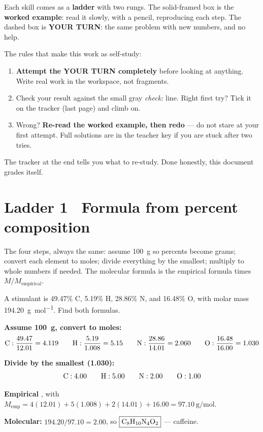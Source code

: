 \documentclass{apchem-worksheet}
\begin{document}
\apctitleblock

\begin{apcnote}
Each skill comes as a \textbf{ladder} with two rungs. The solid-framed box
is the \textbf{worked example}: read it slowly, with a pencil, reproducing
each step. The dashed box is \textbf{YOUR TURN}: the same problem with new
numbers, and no help.

The rules that make this work as self-study:
\begin{enumerate}[leftmargin=*,itemsep=0.15em]
  \item \textbf{Attempt the YOUR TURN completely} before looking at
        anything. Write real work in the workspace, not fragments.
  \item Check your result against the small gray \emph{check:} line. Right
        first try? Tick it on the tracker (last page) and climb on.
  \item Wrong? \textbf{Re-read the worked example, then redo} --- do not
        stare at your first attempt. Full solutions are in the teacher
        key if you are stuck after two tries.
\end{enumerate}
The tracker at the end tells you what to re-study. Done honestly, this
document grades itself.
\end{apcnote}

\section*{\sffamily Ladder 1 \textbullet\ Formula from percent composition}

The four steps, always the same: assume \SI{100}{\gram} so percents become
grams; convert each element to moles; divide everything by the smallest;
multiply to whole numbers if needed. The molecular formula is the
empirical formula times $M/M_{\text{empirical}}$.

\begin{workedexample}[I do: caffeine]
A stimulant is 49.47\% C, 5.19\% H, 28.86\% N, and 16.48\% O, with molar
mass \SI{194.20}{\gram\per\mole}. Find both formulas.

\textbf{Assume \SI{100}{\gram}, convert to moles:}
\[ \ce{C}: \frac{49.47}{12.01} = 4.119 \qquad
   \ce{H}: \frac{5.19}{1.008} = 5.15 \qquad
   \ce{N}: \frac{28.86}{14.01} = 2.060 \qquad
   \ce{O}: \frac{16.48}{16.00} = 1.030 \]

\textbf{Divide by the smallest (1.030):}
\[ \ce{C}: 4.00 \qquad \ce{H}: 5.00 \qquad \ce{N}: 2.00 \qquad
   \ce{O}: 1.00 \]

\textbf{Empirical} , with
$M_{\text{emp}} = 4(12.01) + 5(1.008) + 2(14.01) + 16.00
= \SI{97.10}{\gram\per\mole}$.

\textbf{Molecular:} $194.20 / 97.10 = 2.00$, so
$\boxed{\ce{C8H10N4O2}}$ --- caffeine.
\end{workedexample}
\end{document}
